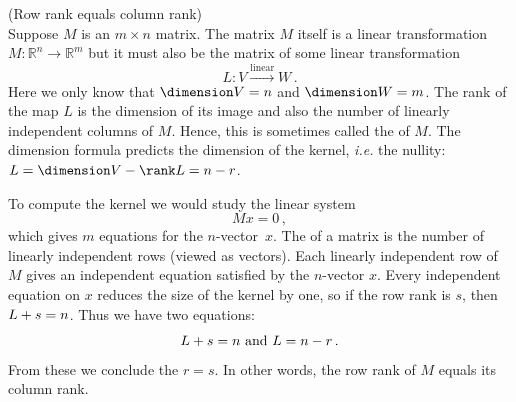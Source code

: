\begin{example} (Row rank equals column rank)\\
Suppose $M$ is an $m\times n$ matrix. The matrix  $M$ itself is a linear transformation $M:{\mathbb R}^n \rightarrow {\mathbb R}^m$ but it  must also  be the matrix of some linear transformation
\[
L:V\stackrel{\textrm{linear}}\longrightarrow W\, .
\]
Here we only know that $\dimension V =n$ and $\dimension W =m$. The rank of the map $L$ is the dimension of its image and also the number of linearly independent columns of $M$. Hence, this is sometimes called the  of $M$. The dimension formula predicts  the dimension of the kernel, {\itshape i.e.} the nullity:  $ \null L= \dimension V-\rank L=n-r$. 

To compute the kernel we would study the linear system \[Mx=0\, ,\] which gives $m$ equations for the $n$-vector~$x$. The  of a matrix is the number of linearly independent rows (viewed as vectors).
Each linearly independent row of $M$ gives an independent equation satisfied by the $n$-vector $x$. Every independent equation on $x$ reduces the size of the kernel by one, so if the row rank is $s$, then $\null L+ s = n$.  Thus we have two equations: 
\[
\null L+s=n \text{ and } \null L = n-r\, .
\]
From these we conclude the $r=s$. In other words, the row rank of $M$ equals its column rank.
 \end{example}



